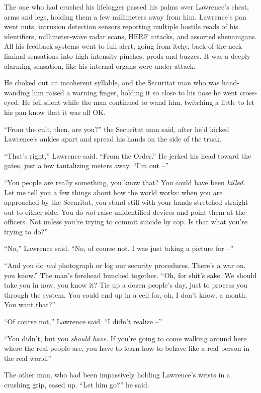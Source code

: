 The one who had crushed his lifelogger passed his palms over Lawrence's 
chest, arms and legs, holding them a few millimeters away from him. 
Lawrence's pan went nuts, intrusion detection sensors reporting 
multiple hostile reads of his identifiers, millimeter-wave radar scans, 
HERF attacks, and assorted shenanigans. All his feedback systems went 
to full alert, going from itchy, back-of-the-neck liminal sensations 
into high intensity pinches, prods and buzzes. It was a deeply alarming 
sensation, like his internal organs were under attack.

He choked out an incoherent syllable, and the Securitat man who was 
hand-wanding him raised a warning finger, holding it so close to his 
nose he went cross-eyed. He fell silent while the man continued to wand 
him, twitching a little to let his pan know that it was all OK.

“From the cult, then, are you?” the Securitat man said, after he'd 
kicked Lawrence's ankles apart and spread his hands on the side of the 
truck.

“That's right,” Lawrence said. “From the Order.” He jerked his 
head toward the gates, just a few tantalizing meters away. “I'm out 
--”

“You people are really something, you know that? You could have been 
\emph{killed}. Let me tell you a few things about how the world works: 
when you are approached by the Securitat, you stand still with your 
hands stretched straight out to either side. You do \emph{not} raise 
unidentified devices and point them at the officers. Not unless you're 
trying to commit suicide by cop. Is that what you're trying to do?”

“No,” Lawrence said. “No, of course not. I was just taking a 
picture for --”

“And you do \emph{not} photograph or log our security procedures. 
There's a war on, you know.” The man's forehead bunched together. 
“Oh, for shit's sake. We should take you in now, you know it? Tie up 
a dozen people's day, just to process you through the system. You could 
end up in a cell for, oh, I don't know, a month. You want that?”

“Of course not,” Lawrence said. “I didn't realize --”

“You didn't, but you \emph{should have}. If you're going to come 
walking around here where the real people are, you have to learn how to 
behave like a real person in the real world.”

The other man, who had been impassively holding Lawrence's wrists in a 
crushing grip, eased up. “Let him go?” he said.

